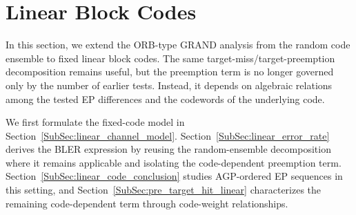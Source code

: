 \documentclass[letterpaper,draftclsnofoot,onecolumn]{IEEEtran}
\begin{document}



\section{Linear Block Codes}\label{Sec:linear_code}


In this section, we extend the ORB-type GRAND analysis from the random code ensemble to fixed linear block codes. The same target-miss/target-preemption decomposition remains useful, but the preemption term is no longer governed only by the number of earlier tests. Instead, it depends on algebraic relations among the tested EP differences and the codewords of the underlying code.

We first formulate the fixed-code model in Section~\ref{SubSec:linear_channel_model}. Section~\ref{SubSec:linear_error_rate} derives the BLER expression by reusing the random-ensemble decomposition where it remains applicable and isolating the code-dependent preemption term. Section~\ref{SubSec:linear_code_conclusion} studies AGP-ordered EP sequences in this setting, and Section~\ref{SubSec:pre_target_hit_linear} characterizes the remaining code-dependent term through code-weight relationships.
\end{document}
